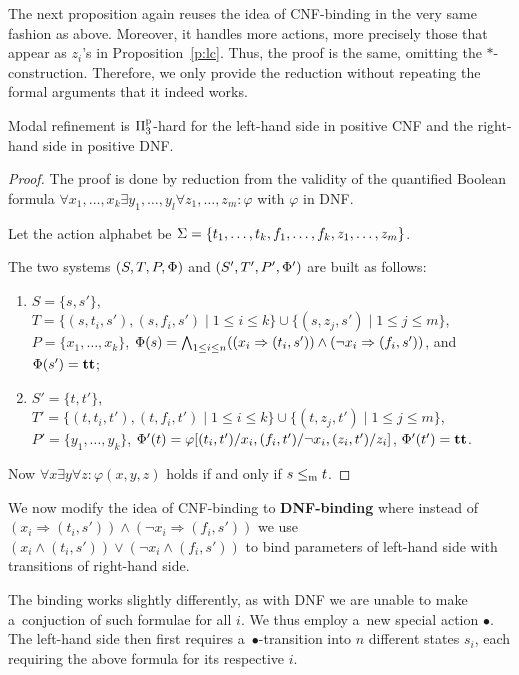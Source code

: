 The next proposition again reuses the idea of CNF-binding in the very same fashion as above. Moreover, it handles more actions, more precisely those that appear as $z_i$'s in Proposition~\ref{p:lc}. Thus, the proof is the same, omitting the $*$-construction. Therefore, we only provide the reduction without repeating the formal arguments that it indeed works.

\begin{proposition}\label{p:lcrd}
Modal refinement is $\mathrm\Pi^\mathrm p_3$-hard for the left-hand side 
in positive CNF and the right-hand side in positive DNF.
\end{proposition}
\begin{proof}
The proof is done by reduction from the validity of 
the quantified Boolean formula
$\forall x_1, \ldots, x_k
\exists y_1,\ldots, y_l \forall z_1,\ldots, z_m
: \varphi$ with $\varphi$ in DNF. 

Let the action alphabet be $\mathrm{\Sigma} = \{t_1, \ldots, t_k, f_1, \ldots, f_k, 
  z_1, \ldots, z_m \}$.

The two systems $(S,T,P,\mathrm{\Phi})$ and $(S',T',P',\mathrm{\Phi}')$ are built as
follows: 
\begin{enumerate}
    \item $S = \{s, s'\}$, 
    $T = \{ (s,t_i,s'), (s,f_i,s') \mid 1 \le i \le k\} \cup \{ (s, z_j, s') \mid 1 \le j \le m \}$, \\
    $P = \{x_1, \ldots, x_k\}$,
    $\mathrm{\Phi}(s) = \bigwedge_{1 \le i \le n} ((x_i \Rightarrow (t_i,s')) \wedge (\neg x_i \Rightarrow (f_i,s'))$, and
    $\mathrm{\Phi}(s') = \mathbf{tt}$;
    \item $S' = \{t, t'\}$, 
    $T' = \{(t,t_i,t'), (t,f_i,t') \mid 1 \le i \le k\} \cup \{(t, z_j, t')\mid 1 \le j \le m\}$, \\
    $P' = \{y_1, \ldots, y_k\}$,
    $\mathrm{\Phi}'(t) = \varphi[(t_i,t')/x_i,(f_i,t')/\neg x_i,(z_i,t')/z_i]$,
    $\mathrm{\Phi}'(t') = \mathbf{tt}$.
\end{enumerate}

Now $\forall x \exists y \forall z : \varphi(x,y,z)$ holds if and only if
$s \le_\mathrm m t$.
\end{proof}

We now modify the idea of CNF-binding to \textbf{DNF-binding} where instead of $(x_i \Rightarrow (t_i,s')) \wedge (\neg x_i \Rightarrow (f_i,s'))$ we use $(x_i \wedge (t_i,s')) \vee (\neg x_i \wedge (f_i,s'))$ to bind parameters of 
left-hand side with transitions of right-hand side. 

The binding works slightly differently, as with DNF we are unable to make
a~conjuction of such formulae for all $i$. We thus employ 
a~new special action $\bullet$. The left-hand side then first requires
a~$\bullet$-transition into $n$ different states $s_i$, each requiring
the above formula for its respective $i$.


